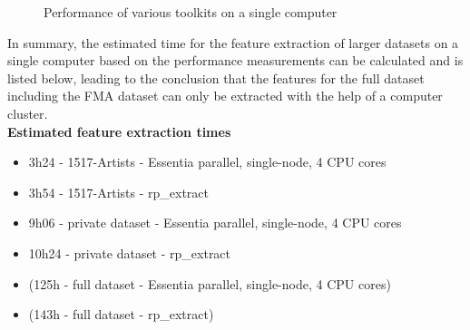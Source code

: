 \begin{figure}[htbp]
	\centering
	\caption{Performance of various toolkits on a single computer}
	\label{perfex}
\end{figure}
\noindent In summary, the estimated time for the feature extraction of larger datasets on a single computer based on the performance measurements can be calculated and is listed below, leading to the conclusion that the features for the full dataset including the FMA dataset can only be extracted with the help of a computer cluster.
\ \\
\textbf{Estimated feature extraction times}
\begin{itemize}
	\setlength\itemsep{-0.5em}
	\item 3h24 - 1517-Artists - Essentia parallel, single-node, 4 CPU cores
	\item 3h54 - 1517-Artists - rp\_extract
	\item 9h06 - private dataset - Essentia parallel, single-node, 4 CPU cores
	\item 10h24 - private dataset - rp\_extract
	\item (125h - full dataset - Essentia parallel, single-node, 4 CPU cores)
	\item (143h - full dataset - rp\_extract)
\end{itemize}

